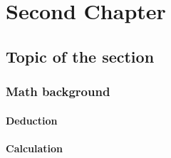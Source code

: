 \chapter{Second Chapter}
\section{Topic of the section}
\subsection{Math background}
\subsubsection{Deduction}
\Blindtext
\subsubsection{Calculation}
\Blindtext
